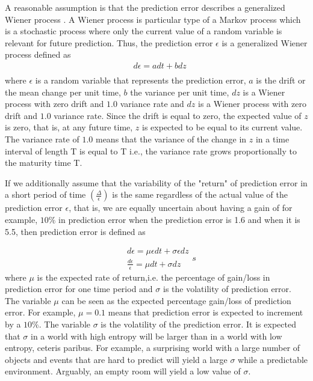 \documentclass[11pt, onecolumn]{article}
\begin{document}
A reasonable assumption is that the prediction error describes a generalized Wiener process \citep{ross_stochastic_1996}. A Wiener process is particular type of a Markov process which is a stochastic process where only the current value of a random variable is relevant for future prediction.  
Thus, the prediction error $\epsilon$ is a generalized Wiener process defined as 
\begin{equation}
\begin{split}
& d \epsilon= a dt + b dz \\
\end{split}
\label{eq:genwiener}
\end{equation}
where $\epsilon$ is a random variable that represents the prediction error, $a$ is the drift or the mean change per unit time, $b$ the variance per unit time, $dz$ is a Wiener process with zero drift and $1.0$ variance rate and $dz$ is a Wiener process with zero drift and $1.0$ variance rate. Since the drift is equal to zero, the expected value of $z$ is zero, that is, at any future time, $z$ is expected to be equal to its current value. The variance rate of $1.0$ means that the variance of the change in $z$ in a time interval of length T is equal to T i.e., the variance rate grows proportionally to the maturity time T. 

If we additionally assume that the variability of the "return" of prediction error in a short period of time $(\frac{\Delta}{\epsilon})$ is the same regardless of the actual value of the prediction error $\epsilon$, that is, we are equally uncertain about having a gain of for example, $10\%$ in prediction error when the prediction error is 1.6 and when it is 5.5, then prediction error is defined as

\begin{equation}
\begin{split}
& d \epsilon= \mu \epsilon dt + \sigma \epsilon dz \\
& \frac{d\epsilon}{\epsilon}= \mu dt + \sigma dz
\end{split}s
\label{eq:wiener}
\end{equation}
where $\mu$ is the expected rate of return,i.e. the percentage of gain/loss in prediction error for one time period and $\sigma$ is the volatility of prediction error.
The variable $\mu$ can be seen as the expected percentage gain/loss of prediction error. For example, $\mu = 0.1$ means that prediction error is expected to increment by a $10\%$. The variable $\sigma$ is the volatility of the prediction error. It is expected that $\sigma$ in a world with high entropy will be larger than in a world with low entropy, ceteris paribus. For example, a surprising world with a large number of objects and events that are hard to predict will yield a large $\sigma$ while a predictable environment. Arguably, an empty room will yield a low value of $\sigma$. 
\end{document}
